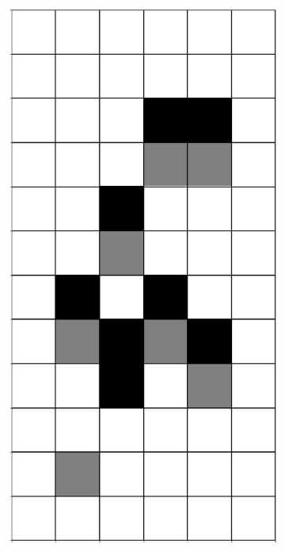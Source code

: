 \documentclass[12pt]{article}
\numberwithin{figure}{section} %
\begin{document}
\begin{figure}[H]
\begin{subfigure}{0.3\textwidth}
     		\subcaption{}
   	\end{subfigure}
     	\begin{subfigure}{0.3\textwidth}
     		\centering
     		\includegraphics[angle=270,width=\linewidth]{Section4/5.1}
     		\subcaption{}
   	\end{subfigure}

\end{figure}
\end{document}

